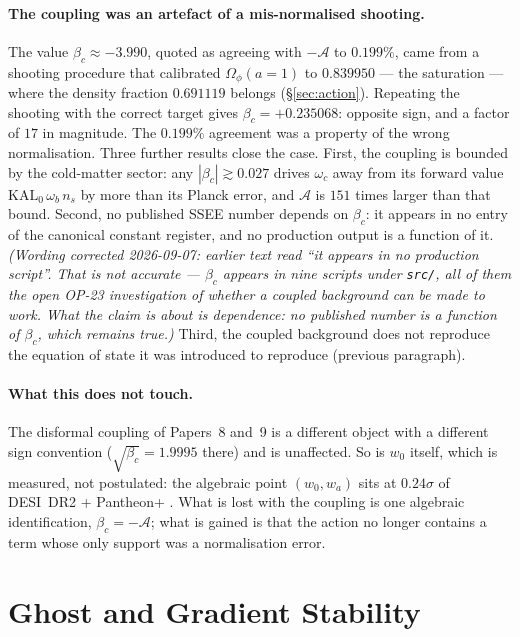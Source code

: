 \documentclass[12pt,a4paper]{article}
\newcommand{\KAL}{\mathrm{KAL}_0}
\newcommand{\AURA}{\mathcal{A}}
\newcommand{\bc}{\beta_c}
\begin{document}
\paragraph{The coupling was an artefact of a mis-normalised shooting.}
The value $\bc \approx -3.990$, quoted as agreeing with $-\AURA$ to
$0.199\%$, came from a shooting procedure that calibrated
$\Omega_\phi(a{=}1)$ to $0.839950$ --- the saturation --- where the
density fraction $0.691119$ belongs (§\ref{sec:action}).  Repeating the
shooting with the correct target gives $\bc = +0.235068$: opposite sign,
and a factor of $17$ in magnitude.  The $0.199\%$ agreement was a
property of the wrong normalisation.
Three further results close the case.  First, the coupling is bounded by
the cold-matter sector: any $|\bc| \gtrsim 0.027$ drives
$\omega_c$ away from its forward value $\KAL\,\omega_b\,n_s$ by more than
its Planck error, and $\AURA$ is $151$ times larger than that bound.
Second, no published SSEE number depends on $\bc$: it appears in no entry
of the canonical constant register, and no production output is a function of
it. \emph{(Wording corrected 2026-09-07: earlier text read ``it appears in no
production script''. That is not accurate --- $\bc$ appears in nine scripts
under \texttt{src/}, all of them the open OP-23 investigation of whether a
coupled background can be made to work. What the claim is about is
\emph{dependence}: no published number is a function of $\bc$, which remains
true.)}
Third, the coupled background does not reproduce the equation of state
it was introduced to reproduce (previous paragraph).

\paragraph{What this does not touch.}
The disformal coupling of Papers~8 and~9 is a different object with a
different sign convention ($\sqrt{\bc}=1.9995$ there) and is unaffected.
So is $w_0$ itself, which is measured, not postulated: the algebraic
point $(w_0,w_a)$ sits at $0.24\sigma$ of DESI~DR2 + Pantheon+
\citep{desidr2_2025,ssee_paper2}.  What is lost with the coupling is one
algebraic identification, $\bc = -\AURA$; what is gained is that the
action no longer contains a term whose only support was a normalisation
error.

\section{Ghost and Gradient Stability}
\label{sec:stability}
\end{document}

